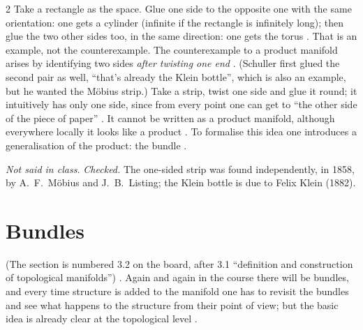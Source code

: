 \begin{paracol}{2}
Take a rectangle as the space. Glue one side to the opposite one with the same orientation: one gets a cylinder (infinite if the rectangle is infinitely long); then glue the two other sides too, in the same direction: one gets the torus
. That is an example, not the counterexample. The counterexample to a product manifold arises by identifying two sides \emph{after twisting one end} .
(Schuller first glued the second pair as well, ``that's already the Klein bottle'', which is also an example, but he wanted the Möbius strip.) Take a strip, twist one side and glue it round; it intuitively has only one side, since from every point
one can get to ``the other side of the piece of paper'' . It cannot be written as a product manifold, although everywhere locally it looks like a product .
To formalise this idea one introduces a generalisation of the product: the bundle .
\begin{history}
\emph{Not said in class.} \emph{Checked.} The one-sided strip was found independently, in 1858, by A.~F.~M\"obius and J.~B.~Listing; the Klein bottle is due to Felix Klein (1882).
\end{history}

\section{Bundles}\label{sec:mf-bundles}

(The section is numbered 3.2 on the board, after 3.1 ``definition and construction of topological manifolds'') . Again and again in the course there will be bundles, and every time structure is added to the manifold one has to revisit
the bundles and see what happens to the structure from their point of view; but the basic idea is already clear at the topological level .


\end{paracol}

